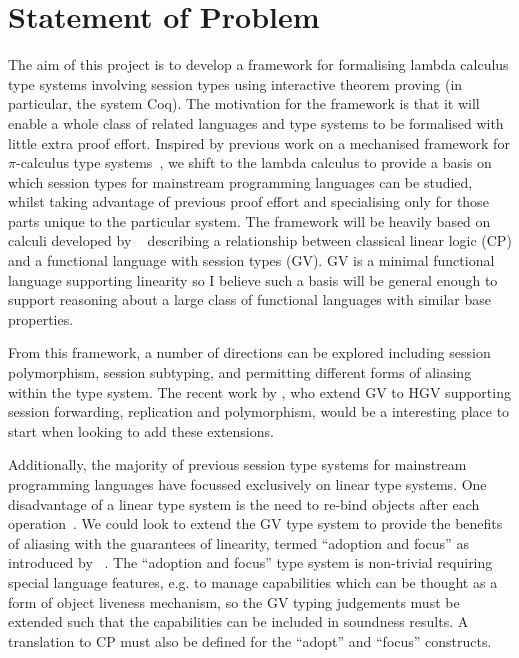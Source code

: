 \documentclass{mprop}
\begin{document}
\section{Statement of Problem}

The aim of this project is to develop a framework for formalising lambda
calculus type systems involving session types using interactive theorem
proving (in particular, the system Coq). The motivation for the framework is
that it will enable a whole class of related languages and type systems to be
formalised with little extra proof effort. Inspired by previous work on a
mechanised framework for $\pi$-calculus type systems~\cite{Gay:2001:FFP}, we
shift to the lambda calculus to provide a basis on which session types for
mainstream programming languages can be studied, whilst taking advantage of
previous proof effort and specialising only for those parts unique to the
particular system. The framework will be heavily based on calculi developed by \citeauthor{Wadler:2012}~\cite{Wadler:2012} describing a relationship between classical linear logic (CP) and a functional language with session types (GV). GV is a minimal functional language supporting linearity so I believe such a basis will be general enough to support reasoning about a large class of functional languages with similar base properties.

From this framework, a number of directions can be explored including
session polymorphism, session subtyping, and permitting different forms of
aliasing within the type system. The recent work by \citeauthor{Lindley:2014:SAP} \cite{Lindley:2014:SAP}, who extend GV to HGV supporting session forwarding, replication and polymorphism, would be a interesting place to start when looking to add these extensions.

Additionally, the majority of previous session type systems for mainstream programming languages have focussed exclusively on linear type systems. One disadvantage of a linear type system is the need to re-bind objects after each operation~\cite{Gay:2010:LAST}. We could look to extend the GV type system to provide the benefits of aliasing with the guarantees of linearity, termed ``adoption and focus'' as introduced by~\citeauthor{Fahndrich:2002} \cite{Fahndrich:2002}. The ``adoption and focus'' type system is non-trivial requiring special language features, e.g. to manage capabilities which can be thought as a form of object liveness mechanism, so the GV typing judgements must be extended such that the capabilities can be included in soundness results. A translation to CP must also be defined for the ``adopt'' and ``focus'' constructs.
\end{document}
